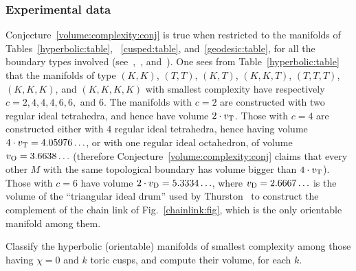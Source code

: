 \documentclass[10pt]{article}      %
\newcommand{\voltet}{v_{\rm T}}
\newcommand{\voloct}{v_{\rm O}}
\newcommand{\voldrum}{v_{\rm D}}
\begin{document}
\subsubsection{Experimental data}
Conjecture~\ref{volume:complexity:conj} is true
when restricted to the manifolds of Tables~\ref{hyperbolic:table},
~\ref{cusped:table}, and~\ref{geodesic:table}, for all the boundary types involved
(see~\cite{CaHiWe},~\cite{SnapPea}, and~\cite{FriMaPe2}).
One sees from Table~\ref{hyperbolic:table} that the manifolds of type
$(K,K)$, $(T,T)$, $(K,T)$, $(K,K,T)$, $(T,T,T)$, $(K,K,K)$, and $(K,K,K,K)$ 
with smallest complexity have respectively $c=2,4,4,4,6,6,$ 
and $6$. The manifolds with $c=2$ are constructed with two regular ideal tetrahedra,
and hence have volume $2\cdot\voltet$. Those with $c=4$ are constructed either with
$4$ regular ideal tetrahedra, hence having volume $4\cdot\voltet = 4.05976\ldots$,
or with one regular ideal octahedron, of volume $\voloct = 3.6638\ldots$ (therefore
Conjecture~\ref{volume:complexity:conj} claims that every other $M$ with the same
topological boundary has volume bigger than $4\cdot\voltet$). Those with $c=6$
have volume $2\cdot\voldrum = 5.3334\ldots$, where  $\voldrum = 2.6667\ldots$ is the volume of 
the ``triangular ideal drum''
used by Thurston~\cite{Thu} to construct
the complement of the chain link of Fig.~\ref{chainlink:fig}, which is the only
orientable manifold among them.

\begin{problem}
Classify the hyperbolic (orientable) manifolds of smallest complexity among those having
$\chi=0$ and $k$ toric cusps, and compute their volume, for each $k$.
\end{problem}
\end{document}
